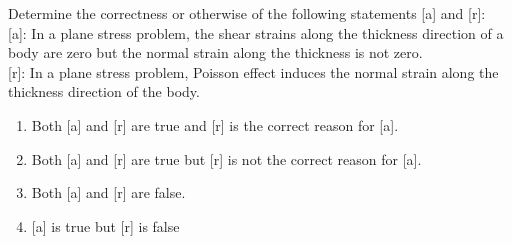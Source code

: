 \item Determine the correctness or otherwise of the following statements [a] and [r]:\\

[a]: In a plane stress problem, the shear strains along the thickness direction of a body are zero but the normal strain along the thickness is not zero.\\

[r]: In a plane stress problem, Poisson effect induces the normal strain along the thickness direction of the body.
\begin{enumerate}
    \item Both [a] and [r] are true and [r] is the correct reason for [a].
    \item Both [a] and [r] are true but [r] is not the correct reason for [a].
    \item Both [a] and [r] are false.
    \item
    
    [a] is true but [r] is false
\end{enumerate}

